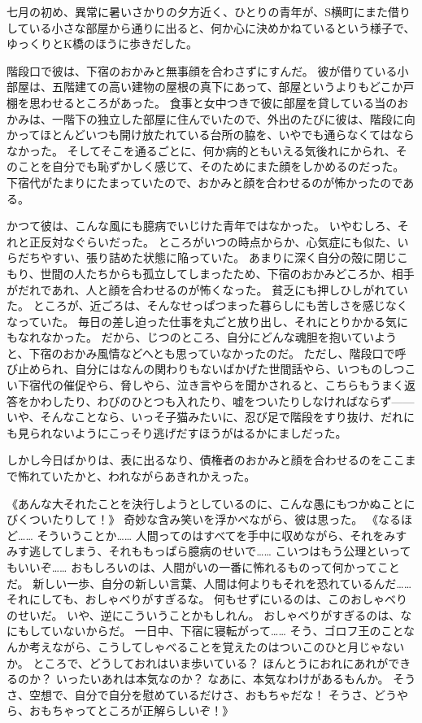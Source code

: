 七月の初め、異常に暑いさかりの夕方近く、ひとりの青年が、S横町にまた借りしている小さな部屋から通りに出ると、何か心に決めかねているという様子で、ゆっくりとK橋のほうに歩きだした。

階段口で彼は、下宿のおかみと無事顔を合わさずにすんだ。
彼が借りている小部屋は、五階建ての高い建物の屋根の真下にあって、部屋というよりもどこか戸棚を思わせるところがあった。
食事と女中つきで彼に部屋を貸している当のおかみは、一階下の独立した部屋に住んでいたので、外出のたびに彼は、階段に向かってほとんどいつも開け放たれている台所の脇を、いやでも通らなくてはならなかった。
そしてそこを通るごとに、何か病的ともいえる気後れにかられ、そのことを自分でも恥ずかしく感じて、そのためにまた顔をしかめるのだった。
下宿代がたまりにたまっていたので、おかみと顔を合わせるのが怖かったのである。

かつて彼は、こんな風にも臆病でいじけた青年ではなかった。
いやむしろ、それと正反対なぐらいだった。
ところがいつの時点からか、心気症にも似た、いらだちやすい、張り詰めた状態に陥っていた。
あまりに深く自分の殻に閉じこもり、世間の人たちからも孤立してしまったため、下宿のおかみどころか、相手がだれであれ、人と顔を合わせるのが怖くなった。
貧乏にも押しひしがれていた。
ところが、近ごろは、そんなせっぱつまった暮らしにも苦しさを感じなくなっていた。
毎日の差し迫った仕事を丸ごと放り出し、それにとりかかる気にもなれなかった。
だから、じつのところ、自分にどんな魂胆を抱いていようと、下宿のおかみ風情などへとも思っていなかったのだ。
ただし、階段口で呼び止められ、自分にはなんの関わりもないばかげた世間話やら、いつものしつこい下宿代の催促やら、脅しやら、泣き言やらを聞かされると、こちらもうまく返答をかわしたり、わびのひとつも入れたり、嘘をついたりしなければならず——いや、そんなことなら、いっそ子猫みたいに、忍び足で階段をすり抜け、だれにも見られないようにこっそり逃げだすほうがはるかにましだった。

しかし今日ばかりは、表に出るなり、債権者のおかみと顔を合わせるのをここまで怖れていたかと、われながらあきれかえった。

《あんな大それたことを決行しようとしているのに、こんな愚にもつかぬことにびくついたりして！》
奇妙な含み笑いを浮かべながら、彼は思った。
《なるほど……
そういうことか……
人間ってのはすべてを手中に収めながら、それをみすみす逃してしまう、それももっぱら臆病のせいで……
こいつはもう公理といってもいいぞ……
おもしろいのは、人間がいの一番に怖れるものって何かってことだ。
新しい一歩、自分の新しい言葉、人間は何よりもそれを恐れているんだ……
それにしても、おしゃべりがすぎるな。
何もせずにいるのは、このおしゃべりのせいだ。
いや、逆にこういうことかもしれん。
おしゃべりがすぎるのは、なにもしていないからだ。
一日中、下宿に寝転がって……
そう、ゴロフ王のことなんか考えながら、こうしてしゃべることを覚えたのはついこのひと月じゃないか。
ところで、どうしておれはいま歩いている？
ほんとうにおれにあれができるのか？
いったいあれは本気なのか？
なあに、本気なわけがあるもんか。
そうさ、空想で、自分で自分を慰めているだけさ、おもちゃだな！
そうさ、どうやら、おもちゃってところが正解らしいぞ！》

